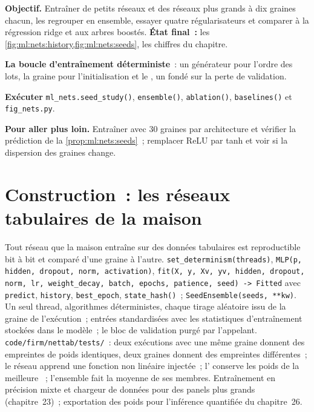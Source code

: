 \begin{tutorial}
\textbf{Objectif.} Entraîner de petits réseaux et des réseaux plus grands à dix graines chacun, les regrouper en ensemble, essayer quatre régularisateurs et comparer
à la régression ridge et aux arbres boostés. \textbf{État final~:} les \cref{fig:ml:nets:history,fig:ml:nets:seeds}, les chiffres du chapitre.
\begin{tutsteps}
\item \textbf{La boucle d'entraînement déterministe}~: un générateur pour l'ordre des lots, la graine pour l'initialisation et
le , un  fondé sur la perte de validation.
\label{lst:ml:nets:fit}
\item \textbf{Exécuter} \texttt{ml\_nets.seed\_study()}, \texttt{ensemble()}, \texttt{ablation()}, \texttt{baselines()} et
\texttt{fig\_nets.py}.
\end{tutsteps}
\textbf{Pour aller plus loin.} Entraîner avec 30 graines par architecture et vérifier la prédiction de la \cref{prop:ml:nets:seeds}~;
remplacer ReLU par tanh et voir si la dispersion des graines change.
\end{tutorial}

\section{Construction~: les réseaux tabulaires de la maison}\label{bld:ml:neural-networks-for-noisy-tabular-data:nettab}

\begin{build}
 Tout réseau que la maison entraîne sur des données tabulaires est reproductible bit à bit et comparé d'une graine à l'autre.
 \texttt{set\_determinism(threads)}, \texttt{MLP(p, hidden, dropout, norm, activation)},
\texttt{fit(X, y, Xv, yv, hidden, dropout, norm, lr, weight\_decay, batch, epochs, patience, seed) -> Fitted} avec
\texttt{predict}, \texttt{history}, \texttt{best\_epoch}, \texttt{state\_hash()}~; \texttt{SeedEnsemble(seeds, **kw)}.
 Un seul thread, algorithmes déterministes, chaque tirage aléatoire issu de la graine de l'exécution~; entrées standardisées avec
les statistiques d'entraînement stockées dans le modèle~; le bloc de validation purgé par l'appelant.
 \texttt{code/firm/nettab/tests/}~: deux exécutions avec une même graine donnent des empreintes de poids identiques, deux
graines donnent des empreintes différentes~; le réseau apprend une fonction non linéaire injectée~; l' conserve les poids de la meilleure
~; l'ensemble fait la moyenne de ses membres.
 Entraînement en précision mixte et chargeur de données pour des panels plus grands (chapitre~23)~; exportation des poids pour
l'inférence quantifiée du chapitre~26.
\end{build}


